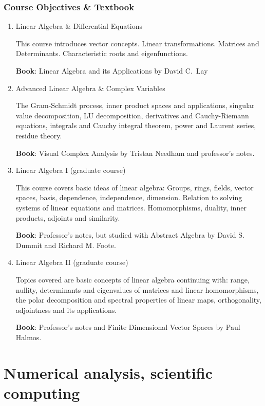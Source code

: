 \documentclass[11pt]{article}
\begin{document}
\subsubsection*{Course Objectives \& Textbook}
\begin{enumerate}
    \item Linear Algebra \& Differential Equations
    
    This course introduces vector concepts. Linear transformations. Matrices and Determinants. Characteristic roots and eigenfunctions.
    
    \textbf{Book}: Linear Algebra and its Applications by David C.\ Lay
    
    \item Advanced Linear Algebra \& Complex Variables
    
    The Gram-Schmidt process, inner product spaces and applications, singular value decomposition, LU decomposition, derivatives and Cauchy-Riemann equations, integrals and Cauchy integral theorem, power and Laurent series, residue theory.
    
    \textbf{Book}: Visual Complex Analysis by Tristan Needham and professor's notes.
    
    \item Linear Algebra I (graduate course)
    
    This course covers basic ideas of linear algebra: Groups, rings, fields, vector spaces, basis, dependence, independence, dimension. Relation to solving systems of linear equations and matrices. Homomorphisms, duality, inner products, adjoints and similarity.
    
    \textbf{Book}: Professor's notes, but studied with Abstract Algebra by 	David S. Dummit and Richard M. Foote.
    
    \item Linear Algebra II (graduate course)
    
    Topics covered are basic concepts of linear algebra continuing with: range, nullity, determinants and eigenvalues of matrices and linear homomorphisms, the polar decomposition and spectral properties of linear maps, orthogonality, adjointness and its applications.
    
    \textbf{Book}: Professor's notes and Finite Dimensional Vector Spaces by Paul Halmos.
\end{enumerate}

\section*{Numerical analysis, scientific computing}
\end{document}
